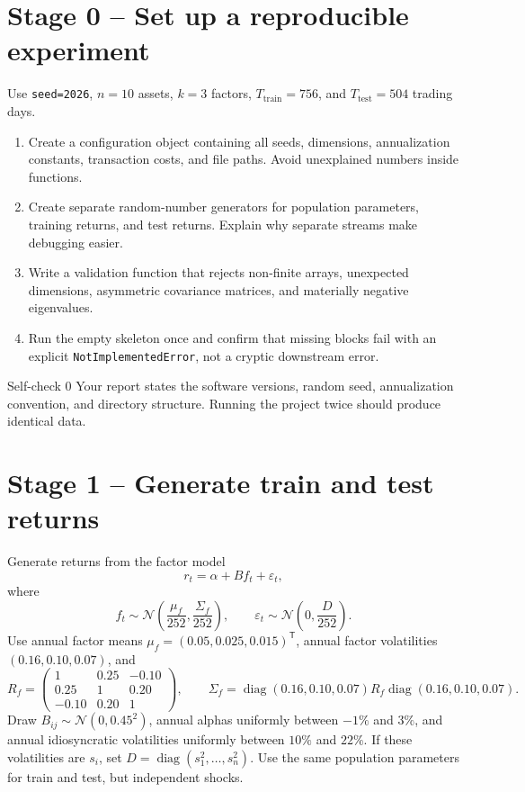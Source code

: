 \documentclass[10pt]{article}
\newcommand{\trans}{^{\mathsf T}}
\newcommand{\diag}{\operatorname{diag}}
\begin{document}
\section{Stage 0 -- Set up a reproducible experiment}

Use \texttt{seed=2026}, $n=10$ assets, $k=3$ factors,
$T_{\mathrm{train}}=756$, and $T_{\mathrm{test}}=504$ trading days.

\begin{enumerate}[label=\textbf{0.\arabic*.}]
\item Create a configuration object containing all seeds, dimensions,
annualization constants, transaction costs, and file paths. Avoid unexplained
numbers inside functions.
\item Create separate random-number generators for population parameters,
training returns, and test returns. Explain why separate streams make debugging
easier.
\item Write a validation function that rejects non-finite arrays, unexpected
dimensions, asymmetric covariance matrices, and materially negative
eigenvalues.
\item Run the empty skeleton once and confirm that missing blocks fail with an
explicit \texttt{NotImplementedError}, not a cryptic downstream error.
\end{enumerate}

\begin{checkpointbox}{Self-check 0}
Your report states the software versions, random seed, annualization convention,
and directory structure. Running the project twice should produce identical data.
\end{checkpointbox}

\section{Stage 1 -- Generate train and test returns}

Generate returns from the factor model
\[
r_t=\alpha+Bf_t+\varepsilon_t,
\]
where
\[
f_t\sim\mathcal N\!\left(\frac{\mu_f}{252},
\frac{\Sigma_f}{252}\right),\qquad
\varepsilon_t\sim\mathcal N\!\left(0,\frac{D}{252}\right).
\]
Use annual factor means
$\mu_f=(0.05,0.025,0.015)\trans$, annual factor volatilities
$(0.16,0.10,0.07)$, and
\[
R_f=\begin{pmatrix}
1&0.25&-0.10\\0.25&1&0.20\\-0.10&0.20&1
\end{pmatrix},
\qquad
\Sigma_f=\diag(0.16,0.10,0.07)R_f\diag(0.16,0.10,0.07).
\]
Draw $B_{ij}\sim\mathcal N(0,0.45^2)$, annual alphas uniformly between
$-1\%$ and $3\%$, and annual idiosyncratic volatilities uniformly between
$10\%$ and $22\%$. If these volatilities are $s_i$, set
$D=\diag(s_1^2,\ldots,s_n^2)$. Use the same population parameters for train
and test, but independent shocks.
\end{document}
